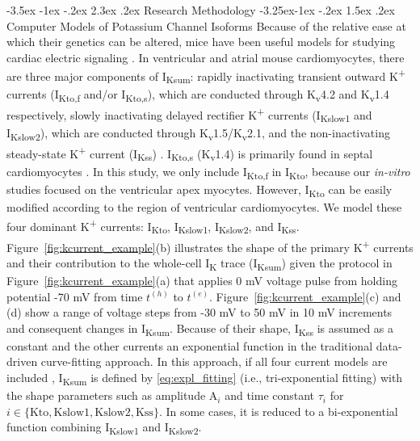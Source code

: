 \documentclass[11pt]{article}
\makeatletter
\renewcommand\section{\@startsection {section}{1}{\z@}%
                                   {-3.5ex \@plus -1ex \@minus -.2ex}%
                                   {2.3ex \@plus.2ex}%
                                   {\normalfont\fontfamily{phv}\fontsize{16}{19}\bfseries}}
\renewcommand\subsection{\@startsection{subsection}{2}{\z@}%
                                     {-3.25ex\@plus -1ex \@minus -.2ex}%
                                     {1.5ex \@plus .2ex}%
                                     {\normalfont\fontfamily{phv}\fontsize{14}{17}\bfseries}}
\makeatother
\begin{document}
\section{Research Methodology}
\subsection{Computer Models of Potassium Channel Isoforms}
Because of the relative ease at which their genetics can be altered, mice have been useful models for studying cardiac electric signaling \citep{milani2014small,nerbonne2004studying}. In ventricular and atrial mouse cardiomyocytes, there are three major components of I\textsubscript{Ksum}: rapidly inactivating transient outward K\textsuperscript{+} currents (I\textsubscript{Kto,f} and/or I\textsubscript{Kto,s}), which are conducted through K\textsubscript{v}4.2 and K\textsubscript{v}1.4 respectively, slowly inactivating delayed rectifier K\textsuperscript{+} currents (I\textsubscript{Kslow1} and I\textsubscript{Kslow2}), which are conducted through K\textsubscript{v}1.5/K\textsubscript{v}2.1, and the non-inactivating steady-state K\textsuperscript{+} current (I\textsubscript{Kss}) \citep{xu1999four}. I\textsubscript{Kto,s} (K\textsubscript{v}1.4) is primarily found in septal cardiomyocytes \citep{bondarenko2004computer}. In this study, we only include I\textsubscript{Kto,f} in I\textsubscript{Kto}, because our \textit{in-vitro} studies focused on the ventricular apex myocytes. However, I\textsubscript{Kto} can be easily modified according to the region of ventricular cardiomyocytes. We model these four dominant K\textsuperscript{+} currents: I\textsubscript{Kto}, I\textsubscript{Kslow1}, I\textsubscript{Kslow2}, and I\textsubscript{Kss}. Figure~\ref{fig:kcurrent_example}(b) illustrates the shape of the primary K\textsuperscript{+} currents and their contribution to the whole-cell I\textsubscript{K} trace (I\textsubscript{Ksum}) given the protocol in Figure~\ref{fig:kcurrent_example}(a) that applies 0 mV voltage pulse from holding potential -70 mV from time $t^{(h)}$ to $t^{(e)}$. Figure~\ref{fig:kcurrent_example}(c) and (d) show a range of voltage steps from -30 mV to 50 mV in 10 mV increments and consequent changes in I\textsubscript{Ksum}. Because of their shape, I\textsubscript{Kss} is assumed as a constant and the other currents an exponential function in the traditional data-driven curve-fitting approach. In this approach, if all four current models are included , I\textsubscript{Ksum} is defined by \eqref{eq:expl_fitting} (i.e., tri-exponential fitting) with the shape parameters such as amplitude $\mathrm{A}_{i}$ and time constant $\tau_{i}$ for $i \in \{\mathrm{Kto}, \mathrm{Kslow1}, \mathrm{Kslow2}, \mathrm{Kss}\}$. In some cases, it is reduced to a bi-exponential function combining I\textsubscript{Kslow1} and I\textsubscript{Kslow2}. 
\end{document}
